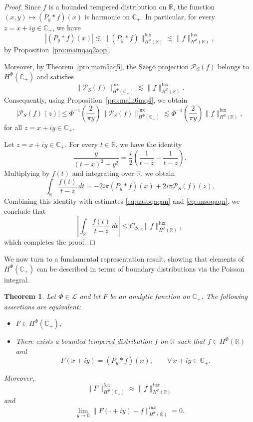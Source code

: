 \documentclass[a4paper,12pt,intlimits,oneside]{amsart}
\newtheorem{theorem}{Theorem}[section]
\theoremstyle{definition}
\numberwithin{equation}{section}
\theoremstyle{definition}
\begin{document}
\begin{proof}
Since $f$ is a bounded tempered distribution on $\mathbb{R}$, the function $(x,y)\mapsto (P_y*f)(x)$ is harmonic on $\mathbb{C}_{+}$. In particular, for every $z=x+iy \in \mathbb{C}_{+}$, we have
\begin{equation}\label{eq:uasoqaqan}
|(P_y*f)(x)| \lesssim \|(P_y*f)\|_{H^{\Phi}(\mathbb{R})}^{\mathrm{lux}}
\lesssim \|f\|_{H^{\Phi}(\mathbb{R})}^{\mathrm{lux}},
\end{equation}
by Proposition~\ref{pro:mainqaq2aop}.

Moreover, by Theorem~\ref{pro:main5aq5}, the Szeg\"o projection $\mathcal{P}_S(f)$ belongs to $H^{\Phi}(\mathbb{C}_{+})$ and satisfies
\[
\|\mathcal{P}_S(f)\|_{H^{\Phi}(\mathbb{C}_{+})}^{\mathrm{lux}}
\lesssim \|f\|_{H^{\Phi}(\mathbb{R})}^{\mathrm{lux}}.
\]
Consequently, using Proposition~\ref{pro:main6mq4}, we obtain
\begin{equation}\label{eq:uasoqaqn}
|\mathcal{P}_S(f)(z)| \leq \Phi^{-1}\left(\frac{2}{\pi y}\right) \|\mathcal{P}_S(f)\|_{H^{\Phi}(\mathbb{C}_{+})}^{\mathrm{lux}}
\lesssim \Phi^{-1}\left(\frac{2}{\pi y}\right) \|f\|_{H^{\Phi}(\mathbb{R})}^{\mathrm{lux}},
\end{equation}
for all $z=x+iy \in \mathbb{C}_{+}$.

Let $z=x+iy \in \mathbb{C}_{+}$. For every $t \in \mathbb{R}$, we have the identity
\[
\frac{y}{(t-x)^2+y^2}
=
\frac{i}{2}\left(\frac{1}{t-\overline{z}}-\frac{1}{t-z}\right).
\]
Multiplying by $f(t)$ and integrating over $\mathbb{R}$, we obtain
\[
\int_{\mathbb{R}}\frac{f(t)}{t-\overline{z}}\,dt
=
-2i\pi (P_y*f)(x)
+
2i\pi \mathcal{P}_S(f)(z).
\]
Combining this identity with estimates \eqref{eq:uasoqaqan} and \eqref{eq:uasoqaqn}, we conclude that
\[
\left|\int_{\mathbb{R}}\frac{f(t)}{t-\overline{z}}\,dt\right|
\leq C_{\Phi, z} \|f\|_{H^{\Phi}(\mathbb{R})}^{\mathrm{lux}},
\]
which completes the proof.
\end{proof}


\medskip

\noindent
We now turn to a fundamental representation result, showing that elements of $H^{\Phi}(\mathbb{C}_{+})$ can be described in terms of boundary distributions via the Poisson integral.


\begin{theorem}\label{pro:main6mmq4}
Let $\Phi \in \mathscr{L}$ and let $F$ be an analytic function on $\mathbb{C}_{+}$. 
The following assertions are equivalent:
\begin{itemize}
\item[(i)] $F \in H^{\Phi}(\mathbb{C}_{+})$;
\item[(ii)] There exists a bounded tempered distribution $f$ on $\mathbb{R}$ such that 
$f \in H^{\Phi}(\mathbb{R})$ and
\[
F(x+iy)=(P_{y}\ast f)(x), \qquad \forall\, x+iy \in \mathbb{C}_{+}.
\]
\end{itemize}
Moreover,
\[
\|F\|_{H^{\Phi}(\mathbb{C}_{+})}^{lux} \approx 
\|f\|_{H^{\Phi}(\mathbb{R})}^{lux}
\]
and
\[
\lim_{y\to 0}\|F(\cdot+iy)-f\|_{H^{\Phi}(\mathbb{R})}^{lux}=0.
\]
\end{theorem}
\end{document}
